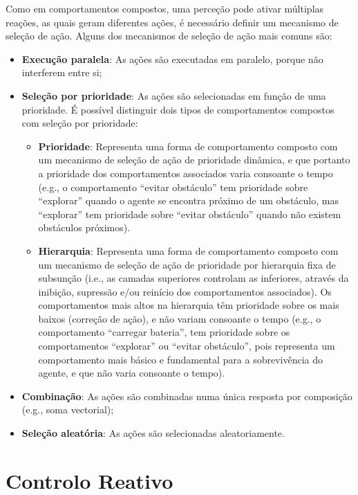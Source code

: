 Como em comportamentos compostos, uma perceção pode ativar múltiplas reações, as quais geram diferentes ações, é necessário definir um mecanismo de seleção de ação.
Alguns dos mecanismos de seleção de ação mais comuns são:

\begin{itemize}
    \item \textbf{Execução paralela}: As ações são executadas em paralelo, porque não interferem entre si;
    \item \textbf{Seleção por prioridade}: As ações são selecionadas em função de uma prioridade.
    É possível distinguir dois tipos de comportamentos compostos com seleção por prioridade:
    \begin{itemize}
        \item \textbf{Prioridade}: Representa uma forma de comportamento composto com um mecanismo de seleção de ação de prioridade dinâmica, e que portanto a prioridade dos comportamentos associados varia consoante o tempo (e.g., o comportamento ``evitar obstáculo'' tem prioridade sobre ``explorar'' quando o agente se encontra próximo de um obstáculo, mas ``explorar'' tem prioridade sobre ``evitar obstáculo'' quando não existem obstáculos próximos).
        \item \textbf{Hierarquia}: Representa uma forma de comportamento composto com um mecanismo de seleção de ação de prioridade por hierarquia fixa de subsunção (i.e., as camadas superiores controlam as inferiores, através da inibição, supressão e/ou reinício dos comportamentos associados).
        Os comportamentos mais altos na hierarquia têm prioridade sobre os mais baixos (correção de ação), e não variam consoante o tempo (e.g., o comportamento ``carregar bateria'', tem prioridade sobre os comportamentos ``explorar'' ou ``evitar obstáculo'', pois representa um comportamento mais básico e fundamental para a sobrevivência do agente, e que não varia consoante o tempo).
    \end{itemize}
    \item \textbf{Combinação}: As ações são combinadas numa única resposta por composição (e.g., soma vectorial);
    \item \textbf{Seleção aleatória}: As ações são selecionadas aleatoriamente.
\end{itemize}


\section{Controlo Reativo}\label{sec:controlo-reativo}

